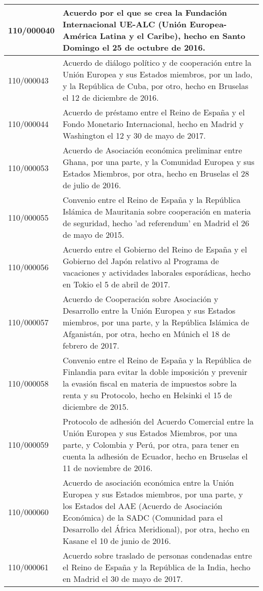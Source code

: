 {\begin{table}[H]
\begin{center}
\begin{tabularx}{\linewidth}{| l | X |}
\hline
110/000040 & Acuerdo por el que se crea la Fundación Internacional UE-ALC (Unión Europea-América Latina y el Caribe), hecho en Santo Domingo el 25 de octubre de 2016. \\
\hline
110/000043 & Acuerdo de diálogo político y de cooperación entre la Unión Europea y sus Estados miembros, por un lado, y la República de Cuba, por otro, hecho en Bruselas el 12 de diciembre de 2016. \\
\hline
110/000044 & Acuerdo de préstamo entre el Reino de España y el Fondo Monetario Internacional, hecho en Madrid y Washington el 12 y 30 de mayo de 2017. \\
\hline
110/000053 & Acuerdo de Asociación económica preliminar entre Ghana, por una parte, y la Comunidad Europea y sus Estados Miembros, por otra, hecho en Bruselas el 28 de julio de 2016. \\
\hline
110/000055 & Convenio entre el Reino de España y la República Islámica de Mauritania sobre cooperación en materia de seguridad, hecho 'ad referendum' en Madrid el 26 de mayo de 2015. \\
\hline
110/000056 & Acuerdo entre el Gobierno del Reino de España y el Gobierno del Japón relativo al Programa de vacaciones y actividades laborales esporádicas, hecho en Tokio el 5 de abril de 2017. \\
\hline
110/000057 & Acuerdo de Cooperación sobre Asociación y Desarrollo entre la Unión Europea y sus Estados miembros, por una parte, y la República Islámica de Afganistán, por otra, hecho en Múnich el 18 de febrero de 2017. \\
\hline
110/000058 & Convenio entre el Reino de España y la República de Finlandia para evitar la doble imposición y prevenir la evasión fiscal en materia de impuestos sobre la renta y su Protocolo, hecho en Helsinki el 15 de diciembre de 2015. \\
\hline
110/000059 & Protocolo de adhesión del Acuerdo Comercial entre la Unión Europea y sus Estados Miembros, por una parte, y Colombia y Perú, por otra, para tener en cuenta la adhesión de Ecuador, hecho en Bruselas el 11 de noviembre de 2016. \\
\hline
110/000060 & Acuerdo de asociación económica entre la Unión Europea y sus Estados miembros, por una parte, y los Estados del AAE (Acuerdo de Asociación Económica) de la SADC (Comunidad para el Desarrollo del África Meridional), por otra, hecho en Kasane el 10 de junio de 2016. \\
\hline
110/000061 & Acuerdo sobre traslado de personas condenadas entre el Reino de España y la República de la India, hecho en Madrid el 30 de mayo de 2017. \\

\end{tabularx}
\end{center}
\end{table}}
